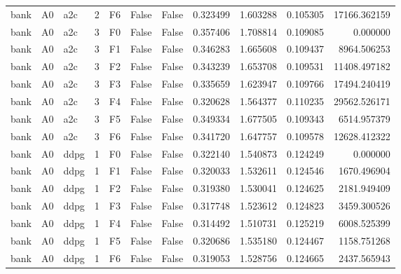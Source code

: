 \begin{tabular}{lllrlllrrrr}
      bank &      A0 &       a2c &     2 &  F6 &           False &            False &  0.323499 &  1.603288 & 0.105305 &     17166.362159 \\
      bank &      A0 &       a2c &     3 &  F0 &           False &            False &  0.357406 &  1.708814 & 0.109085 &         0.000000 \\
      bank &      A0 &       a2c &     3 &  F1 &           False &            False &  0.346283 &  1.665608 & 0.109437 &      8964.506253 \\
      bank &      A0 &       a2c &     3 &  F2 &           False &            False &  0.343239 &  1.653708 & 0.109531 &     11408.497182 \\
      bank &      A0 &       a2c &     3 &  F3 &           False &            False &  0.335659 &  1.623947 & 0.109766 &     17494.240419 \\
      bank &      A0 &       a2c &     3 &  F4 &           False &            False &  0.320628 &  1.564377 & 0.110235 &     29562.526171 \\
      bank &      A0 &       a2c &     3 &  F5 &           False &            False &  0.349334 &  1.677505 & 0.109343 &      6514.957379 \\
      bank &      A0 &       a2c &     3 &  F6 &           False &            False &  0.341720 &  1.647757 & 0.109578 &     12628.412322 \\
      bank &      A0 &      ddpg &     1 &  F0 &           False &            False &  0.322140 &  1.540873 & 0.124249 &         0.000000 \\
      bank &      A0 &      ddpg &     1 &  F1 &           False &            False &  0.320033 &  1.532611 & 0.124546 &      1670.496904 \\
      bank &      A0 &      ddpg &     1 &  F2 &           False &            False &  0.319380 &  1.530041 & 0.124625 &      2181.949409 \\
      bank &      A0 &      ddpg &     1 &  F3 &           False &            False &  0.317748 &  1.523612 & 0.124823 &      3459.300526 \\
      bank &      A0 &      ddpg &     1 &  F4 &           False &            False &  0.314492 &  1.510731 & 0.125219 &      6008.525399 \\
      bank &      A0 &      ddpg &     1 &  F5 &           False &            False &  0.320686 &  1.535180 & 0.124467 &      1158.751268 \\
      bank &      A0 &      ddpg &     1 &  F6 &           False &            False &  0.319053 &  1.528756 & 0.124665 &      2437.565943 \\

\end{tabular}
